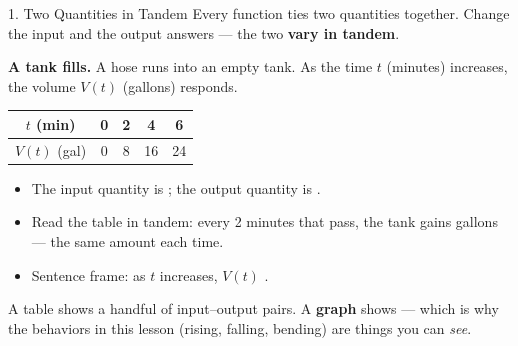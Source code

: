 \documentclass[10pt]{article}
\begin{document}
\boxguard[20]
\begin{notesbox}{1. Two Quantities in Tandem}
Every function ties two quantities together. Change the input and the output
answers --- the two \textbf{vary in tandem}.

\medskip
\textbf{A tank fills.} A hose runs into an empty tank. As the time $t$
(minutes) increases, the volume $V(t)$ (gallons) responds.

\smallskip
\renewcommand{\arraystretch}{1.4}
\begin{tabular}{|c|c|c|c|c|}
\hline
$t$ (min) & 0 & 2 & 4 & 6 \\
\hline
$V(t)$ (gal) & 0 & 8 & 16 & 24 \\
\hline
\end{tabular}
\smallskip

\begin{itemize}[itemsep=4pt]
  \item The input quantity is ; the output quantity is
        .
  \item Read the table in tandem: every 2 minutes that pass, the tank gains
         gallons --- the same amount each time.
  \item Sentence frame: as $t$ increases, $V(t)$ .
\end{itemize}

\medskip
A table shows a handful of input--output pairs. A \textbf{graph} shows
 --- which is why the behaviors in this lesson
(rising, falling, bending) are things you can \textit{see}.
\end{notesbox}

\vspace{0.1in}
\end{document}
